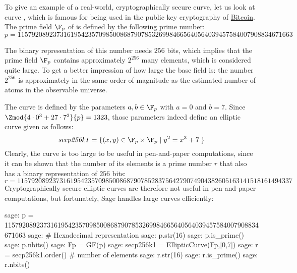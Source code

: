 \begin{example}\label{secp256k1}
To give an example of a real-world, cryptographically secure curve, let us look at curve , which is famous for being used in the public key cryptography of \href{https://bitcoin.org/}{Bitcoin}. The prime field $\F_p$ of  is defined by the following prime number:
$$
p = \scriptstyle 115792089237316195423570985008687907853269984665640564039457584007908834671663
$$
 
 The binary representation of this number needs $256$ bits, which implies that the prime field $\F_p$  contains approximately $2^{256}$ many elements, which is considered quite large. To get a better impression of how large the base field is: the number $2^{256}$ is approximately in the same order of magnitude as the estimated number of atoms in the observable universe. 

The curve  is defined by the parameters $a,b\in \F_p$ with $a=0$ and $b=7$. Since $\Zmod{4\cdot 0^3 + 27\cdot 7^2}{p}=1323$, those parameters indeed define an elliptic curve given as follows:
$$
\mathit{secp256k1} = \{(x,y)\in \F_p\times \F_p \;|\; y^2 = x^3 +7\;\} 
$$
Clearly, the  curve is too large to be useful in pen-and-paper computations, since it can be shown that  the number of its elements is a prime number $r$ that also has a binary representation of $256$ bits:
$$
r = \scriptstyle 11579208923731619542357098500868790785283756427907490438260516
3141518161494337
$$
Cryptographically secure elliptic curves are therefore not useful in pen-and-paper computations, but fortunately, Sage handles large curves efficiently:
\begin{sagecommandline}
sage: p = 115792089237316195423570985008687907853269984665640564039457584007908834671663
sage: # Hexadecimal representation
sage: p.str(16)
sage: p.is_prime()
sage: p.nbits()
sage: Fp = GF(p)
sage: secp256k1 = EllipticCurve(Fp,[0,7])
sage: r = secp256k1.order() # number of elements
sage: r.str(16)
sage: r.is_prime()
sage: r.nbits()
\end{sagecommandline}
\end{example}
